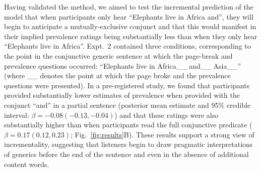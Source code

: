 \documentclass[letterpaper, 12pt]{article}
\newcommand{\denote}[1]{\mbox{ $[\![ #1 ]\!]$}}
\begin{document}




Having validated the method, we aimed to test the incremental prediction of the model that when participants only hear ``Elephants live in Africa and'', they will begin to anticipate a mutually-exclusive conjunct and that this would manifest in their implied prevalence ratings being substantially less than when they only hear ``Elephants live in Africa''.
Expt.~2 contained three conditions, corresponding to the point in the conjunctive generic sentence at which the page-break and prevalence questions occurred: ``Elephants live in Africa\_\_ and\_\_ Asia\_\_'' (where \_\_ denotes the point at which the page broke and the prevalence questions were presented).
In a pre-registered study, we found that participants provided substantially lower estimates of prevalence when provided with the conjunct ``and'' in a partial sentence (posterior mean estimate and 95\% credible interval: $\beta = -0.08 (-0.13, -0.04)$) and that these ratings were also substantially higher than when participants read the full conjunctive predicate ($\beta = 0.17 (0.12, 0.23)$; Fig.~\ref{fig:results}B). 
These results support a strong view of incrementality, suggesting that listeners begin to draw pragmatic interpretations of generics before the end of the sentence and even in the absence of additional content words. 










\setlength{\bibleftmargin}{.125in}
\setlength{\bibindent}{-\bibleftmargin}


\renewcommand\bibname{}
\scriptsize
%
\end{document}
